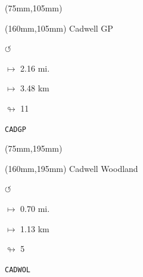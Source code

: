 \begin{textblock*}{80mm}(75mm,105mm)%
\end{textblock*}
\begin{textblock*}{40mm}(160mm,105mm)%
Cadwell GP
\par \Huge$\circlearrowleft$
\Large
\par$\mapsto$ 2.16 mi.
\par$\mapsto$ 3.48 km
\par$\looparrowright$ 11
\par\hfill\tiny\tt CADGP\\
\end{textblock*}
\begin{textblock*}{80mm}(75mm,195mm)%
\end{textblock*}
\begin{textblock*}{40mm}(160mm,195mm)%
Cadwell Woodland
\par \Huge$\circlearrowleft$
\Large
\par$\mapsto$ 0.70 mi.
\par$\mapsto$ 1.13 km
\par$\looparrowright$ 5
\par\hfill\tiny\tt CADWOL\\
\end{textblock*}
\null\newpage

